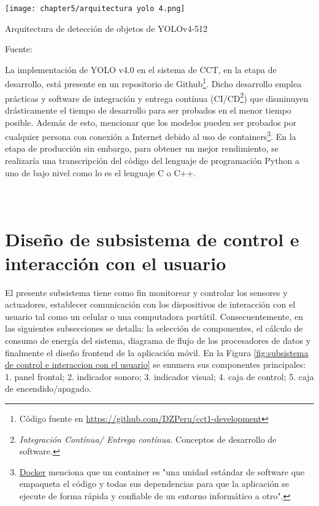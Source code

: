 \begin{myfigure}[H]
	\footnotesize\centering
	\texttt{[image: chapter5/arquitectura yolo 4.png]}
	\caption{Arquitectura de detección de objetos de YOLOv4-512}
	\begin{myflushcenter}
		Fuente: \cite{Solawetz2020}
	\end{myflushcenter}
	\label{fig:arquitectura de deteccion de objetos de YOLOv4-512}
\end{myfigure}

La implementación de YOLO v4.0 en el sistema de CCT, en la etapa de desarrollo, está presente en un repositorio de Github\footnote{ Código fuente en \href{https://github.com/DZPeru/cct1-development}{https://github.com/DZPeru/cct1-development}}. Dicho desarrollo emplea prácticas y software de integración y entrega contínua (CI/CD\footnote{\textit{Integración Contínua/ Entrega contínua}. Conceptos de desarrollo de software.}) que disminuyen drásticamente el tiempo de desarrollo para ser probados en el menor tiempo posible. Además de esto, mencionar que los modelos pueden ser probados por cualquier persona con conexión a Internet debido al uso de containers\footnote{\href{https://www.docker.com/resources/what-container}{Docker} menciona que un container es "una unidad estándar de software que empaqueta el código y todas sus dependencias para que la aplicación se ejecute de forma rápida y confiable de un entorno informático a otro".}. En la etapa de producción sin embargo, para obtener un mejor rendimiento, se realizaría una transcripción del código del lenguaje de programación Python a uno de bajo nivel como lo es el lenguaje C o C++. 


\pagestyle{myportland}
\doublespacing
\chapter[\quad\quad\quad\quad ----- Diseño de subsistema de control e interacción con el usuario]{\\ Diseño de subsistema de control e interacción con el usuario}
\thispagestyle{myportland}
\label{ssec:diseno de subsistema de control e interaccion con el usuario}

El presente subsistema tiene como fin monitorear y controlar los sensores y actuadores, establecer comunicación con los dispositivos de interacción con el usuario tal como un celular o una computadora portátil. Consecuentemente, en las siguientes subsecciones se detalla: la selección de componentes, el cálculo de consumo de energía del sistema, diagrama de flujo de los procesadores de datos y finalmente el diseño frontend de la aplicación móvil. En la Figura \ref{fig:subsistema de control e interaccion con el usuario} se enumera sus componentes principales: 1. panel frontal; 2. indicador sonoro; 3. indicador visual; 4. caja de control; 5. caja de encendido/apagado.

